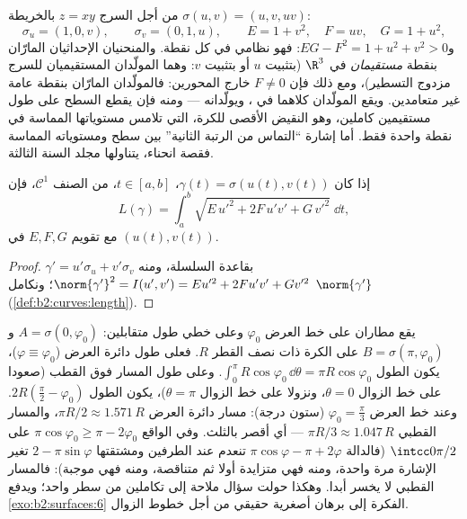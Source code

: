 \begin{example}\label{ex:b2:surfaces:saddlechart}
من أجل السرج $z = xy$ بالخريطة $\sigma(u, v) = (u, v,
uv)$:
\[
\sigma_u = (1, 0, v), \qquad \sigma_v = (0, 1, u),
\qquad
E = 1 + v^2, \quad F = uv, \quad G = 1 + u^2 ,
\]
و$EG - F^2 = 1 + u^2 + v^2 > 0$: فهو نظامي في كل نقطة. والمنحنيان الإحداثيان المارّان بنقطة
\emph{مستقيمان} في $\R^3$ (بتثبيت $u$ أو بتثبيت $v$: وهما
المولّدان المستقيميان للسرج مزدوج التسطير)، ومع ذلك فإن $F \neq 0$ خارج
المحورين: فالمولّدان المارّان بنقطة عامة غير متعامدين. ويقع
المولّدان كلاهما في ، ويولّدانه --- ومنه فإن  يقطع السطح على طول مستقيمين كاملين، وهو النقيض الأقصى للكرة،
التي تلامس مستوياتها المماسة في نقطة واحدة فقط. أما إشارة ``التماس
من الرتبة الثانية'' بين سطح ومستوياته المماسة فقصة انحناء، يتناولها
مجلد السنة الثالثة.
\end{example}

\begin{proposition}\label{prop:b2:surfaces:curvelength}
إذا كان $\gamma(t) = \sigma(u(t), v(t))$، $t \in [a, b]$، من الصنف $\mathcal{C}^1$، فإن
\[
L(\gamma) = \int_a^b
\sqrt{E\,u'^2 + 2F\,u'v' + G\,v'^2}\;\dd t ,
\]
مع تقويم $E, F, G$ في $(u(t), v(t))$.
\end{proposition}

\begin{proof}
$\gamma' = u'\sigma_u + v'\sigma_v$ بقاعدة السلسلة، ومنه $\norm{\gamma'}^2 = I(u', v') = Eu'^2 + 2Fu'v' + Gv'^2$؛ ونكامل $\norm{\gamma'}$ (\cref{def:b2:curves:length}).
\end{proof}

\begin{example}\label{ex:b2:surfaces:polarroute}
يقع مطاران على خط العرض $\varphi_0$ وعلى خطي طول متقابلين: $A = \sigma(0, \varphi_0)$ و$B = \sigma(\pi,
\varphi_0)$
على الكرة ذات نصف القطر $R$. فعلى طول دائرة العرض ($\varphi \equiv \varphi_0$)،
يكون الطول $\int_0^\pi R\cos\varphi_0\,\dd\theta = \pi R\cos\varphi_0$. وعلى طول المسار فوق القطب (صعودا على خط الزوال
$\theta = 0$، ونزولا على خط الزوال $\theta = \pi$)، يكون الطول $2R(\frac\pi2 -
\varphi_0)$. وعند خط
العرض $\varphi_0 = \frac\pi3$ (ستون درجة): مسار دائرة العرض $\pi R/2 \approx 1.571\,R$، والمسار القطبي
$\pi R/3 \approx 1.047\,R$ --- أي أقصر بالثلث. وفي الواقع $\pi\cos\varphi_0 \geq \pi - 2\varphi_0$ على $\intcc0{\pi/2}$ (فالدالة
$\pi\cos\varphi - \pi +
2\varphi$ تنعدم عند الطرفين ومشتقتها $2 -
\pi\sin\varphi$ تغير الإشارة مرة واحدة،
ومنه فهي متزايدة أولا ثم متناقصة، ومنه فهي موجبة): فالمسار القطبي لا
يخسر أبدا. وهكذا حولت  سؤال ملاحة إلى تكاملين
من سطر واحد؛ ويدفع \cref{exo:b2:surfaces:6} الفكرة إلى برهان أصغرية حقيقي من أجل خطوط
الزوال.
\end{example}

